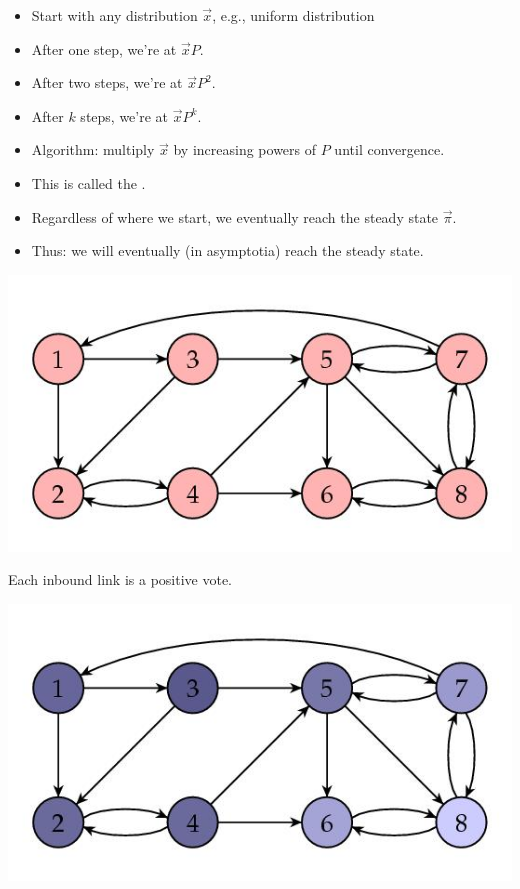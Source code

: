 \documentclass[a4paper,landscape,headrule,footrule,xetex]{foils}
\begin{document}
\begin{itemize}
\item Start with any distribution $\vec{x}$, e.g., uniform distribution
\item After one step, we're at $\vec{x} P$.
\item After two steps, we're at $\vec{x} P^2$.
\item After $k$ steps, we're at $\vec{x} P^k$.
\item Algorithm: multiply $\vec{x}$ by increasing powers of $P$
  until convergence.
\item This is called the .
\item Regardless of where we start, we eventually reach the steady state $\vec{\pi}$.
\item Thus: we will eventually (in asymptotia) reach the steady state.
\end{itemize}

\begin{center}
\includegraphics[height=0.8\textheight]{../pics/goodnet.jpg}  
\end{center}
Each inbound link is a positive vote.


\begin{center}
\includegraphics[height=0.8\textheight]{../pics/goodnet.shaded.jpg}  
\end{center}
\end{document}
